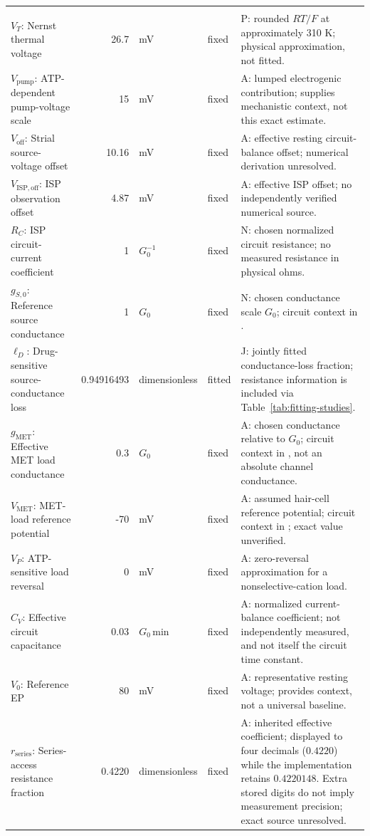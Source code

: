 \begin{longtable}{@{}>{\raggedright\arraybackslash}p{4.4cm}r>{\raggedright\arraybackslash}p{2.0cm}>{\raggedright\arraybackslash}p{1.0cm}>{\raggedright\arraybackslash}p{8.0cm}@{}}
\addlinespace[4pt]\multicolumn{5}{@{}l}{\textbf{Electrical circuit and observation operator}}\\*
\(V_T\): Nernst thermal voltage & 26.7 & mV & fixed & P: rounded \(RT/F\) at approximately 310 K; physical approximation, not fitted. \\
\(V_{\mathrm{pump}}\): ATP-dependent pump-voltage scale & 15 & mV & fixed & A: lumped electrogenic contribution; \citet{Nin2008} supplies mechanistic context, not this exact estimate. \\
\(V_{\mathrm{off}}\): Strial source-voltage offset & 10.16 & mV & fixed & A: effective resting circuit-balance offset; numerical derivation unresolved. \\
\(V_{\mathrm{ISP,off}}\): ISP observation offset & 4.87 & mV & fixed & A: effective ISP offset; no independently verified numerical source. \\
\(R_C\): ISP circuit-current coefficient & 1 & \(G_0^{-1}\) & fixed & N: chosen normalized circuit resistance; no measured resistance in physical ohms. \\
\(g_{S,0}\): Reference source conductance & 1 & \(G_0\) & fixed & N: chosen conductance scale \(G_0\); circuit context in \citet{Davis1958}. \\
\(\ell_D\): Drug-sensitive source-conductance loss & 0.94916493 & dimensionless & fitted & J: jointly fitted conductance-loss fraction; resistance information is included via Table~\ref{tab:fitting-studies}. \\
\(g_{\mathrm{MET}}\): Effective MET load conductance & 0.3 & \(G_0\) & fixed & A: chosen conductance relative to \(G_0\); circuit context in \citet{Davis1958}, not an absolute channel conductance. \\
\(V_{\mathrm{MET}}\): MET-load reference potential & -70 & mV & fixed & A: assumed hair-cell reference potential; circuit context in \citet{Davis1958}; exact value unverified. \\
\(V_P\): ATP-sensitive load reversal & 0 & mV & fixed & A: zero-reversal approximation for a nonselective-cation load. \\
\(C_V\): Effective circuit capacitance & 0.03 & \(G_0\,\mathrm{min}\) & fixed & A: normalized current-balance coefficient; not independently measured, and not itself the circuit time constant. \\
\(V_0\): Reference EP & 80 & mV & fixed & A: representative resting voltage; \citet{SaltKonishi1979} provides context, not a universal baseline. \\
\(r_{\mathrm{series}}\): Series-access resistance fraction & 0.4220 & dimensionless & fixed & A: inherited effective coefficient; displayed to four decimals (\(0.4220\)) while the implementation retains \(0.4220148\). Extra stored digits do not imply measurement precision; exact source unresolved. \\

\end{longtable}
